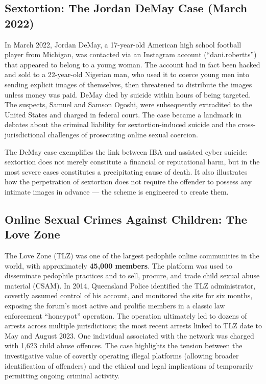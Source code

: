 \documentclass[11pt,a4paper,openany]{report}
\theoremstyle{definition}
\theoremstyle{plain}
\theoremstyle{remark}
\begin{document}
\subsection{Sextortion: The Jordan DeMay Case (March 2022)}

In March 2022, Jordan DeMay, a 17-year-old American high school football player from Michigan, was contacted via an Instagram account (``dani.robertts'') that appeared to belong to a young woman. The account had in fact been hacked and sold to a 22-year-old Nigerian man, who used it to coerce young men into sending explicit images of themselves, then threatened to distribute the images unless money was paid. DeMay died by suicide within hours of being targeted. The suspects, Samuel and Samson Ogoshi, were subsequently extradited to the United States and charged in federal court. The case became a landmark in debates about the criminal liability for sextortion-induced suicide and the cross-jurisdictional challenges of prosecuting online sexual coercion.

\begin{keypoint}
The DeMay case exemplifies the link between IBA and assisted cyber suicide: sextortion does not merely constitute a financial or reputational harm, but in the most severe cases constitutes a precipitating cause of death. It also illustrates how the perpetration of sextortion does not require the offender to possess any intimate images in advance --- the scheme is engineered to create them.
\end{keypoint}

\subsection{Online Sexual Crimes Against Children: The Love Zone}

The Love Zone (TLZ) was one of the largest pedophile online communities in the world, with approximately \textbf{45,000 members}. The platform was used to disseminate pedophile practices and to sell, procure, and trade child sexual abuse material (CSAM). In 2014, Queensland Police identified the TLZ administrator, covertly assumed control of his account, and monitored the site for six months, exposing the forum's most active and prolific members in a classic law enforcement ``honeypot'' operation. The operation ultimately led to dozens of arrests across multiple jurisdictions; the most recent arrests linked to TLZ date to May and August 2023. One individual associated with the network was charged with 1,623 child abuse offences. The case highlights the tension between the investigative value of covertly operating illegal platforms (allowing broader identification of offenders) and the ethical and legal implications of temporarily permitting ongoing criminal activity.
\end{document}

